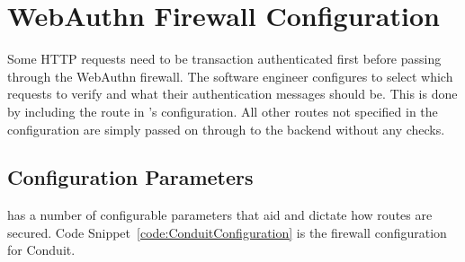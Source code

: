 

\section{WebAuthn Firewall Configuration}


Some HTTP requests need to be transaction authenticated first before passing through the WebAuthn firewall. The software engineer configures \sys{} to select which requests to verify and what their authentication messages should be. This is done by including the route in \sys{}'s configuration. All other routes not specified in the configuration are simply passed on through to the backend without any checks.





\subsection{Configuration Parameters}\label{Sec:ConfigurationParameters}

\sys{} has a number of configurable parameters that aid and dictate how routes are secured. Code Snippet~\ref{code:ConduitConfiguration} is the firewall configuration for Conduit.

